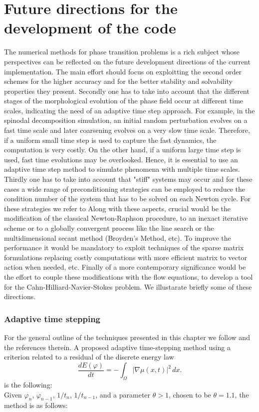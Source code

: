 \documentclass{article}
\begin{document}
\section{Future directions for the development of the code}
The numerical methods for phase transition problems is a rich subject whose perspectives can be reflected on the future development directions of the current implementation. The main effort should focus on exploitting the second order schemes for the higher accuracy and for the better stability and solvability properties they present. Secondly one has to take into account that the different stages of the morphological evolution of the phase field occur at different time scales, indicating the need of an adaptive time step approach. For example, in the spinodal decomposition
simulation, an initial random perturbation evolves on a fast time scale and later coarsening evolves on a very slow time scale.
Therefore, if a uniform small time step is used to capture the fast dynamics, the computation is very costly. On the other
hand, if a uniform large time step is used, fast time evolutions may be overlooked. Hence, it is essential to use an adaptive
time step method to simulate phenomena with multiple time scales. Thirdly one has to take into account that "stiff" systems may occur and for these cases a wide range of preconditioning strategies can be employed to reduce the condition number of the system that has to be solved on each Newton cycle. For these strategies we refer to \cite{Wu2011PreconditionersFT} Along with these aspects, crucial would be the modification of the classical Newton-Raphson procedure, to an inexact iterative scheme or to a globally convergent process like the line search or the multidimensional secant method (Broyden's Method, etc). To improve the performance it would be mandatory to exploit techniques of the sparse matrix formulations replacing costly computations with more efficient matrix to vector action when needed, etc. Finally of a more contemporary significance would be the effort to couple these modifications with the flow equations, to develop a tool for the Cahn-Hilliard-Navier-Stokes problem. We illustarate briefly some of these directions.
\subsubsection{Adaptive time stepping}
For the general outline of the techniques presented in this chapter we follow \cite{LI20171855} and the references therein.
A proposed adaptive time-stepping method using a criterion related to a residual of the discrete energy law \begin{equation}
\frac{dE(\varphi)}{dt} = -\int_{\Omega} \left|\nabla\mu(x, t)\right|^2 \, dx.
\end{equation} is the following:\\
Given $\varphi_n$, $\varphi_{n-1}$, $1/t_n$, $1/t_{n-1}$, and a parameter $\theta > 1$, chosen to be $\theta = 1.1$, the method is as follows:
\end{document}

